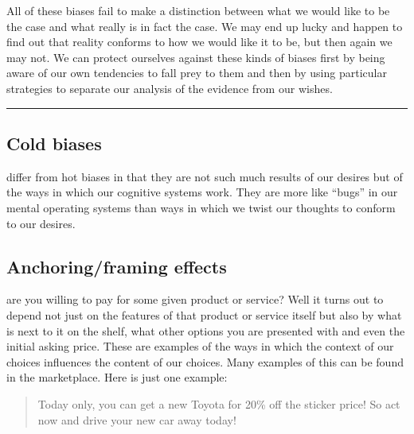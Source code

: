 \documentclass[justified]{tufte-book}
\newenvironment{argument}{\begin{quote}\normalsize}{\end{quote}}
\begin{document}
All of these biases fail to make a distinction between what we would like to be the case and what really is in fact the case. We may end up lucky and happen to find out that reality conforms to how we would like it to be, but then again we may not. We can protect ourselves against these kinds of biases first by being aware of our own tendencies to fall prey to them and then by using particular strategies to separate our analysis of the evidence from our wishes.

\begin{center}\rule{0.5\linewidth}{\linethickness}\end{center}

\hypertarget{cold-biases}{%
\subsection*{\texorpdfstring{\textbf{Cold biases}}{Cold biases}}\label{cold-biases}}

 differ from hot biases in that they are not such much results of our desires but of the ways in which our cognitive systems work. They are more like ``bugs'' in our mental operating systems than ways in which we twist our thoughts to conform to our desires.

\hypertarget{anchoringframing-effects}{%
\subsection*{Anchoring/framing effects}\label{anchoringframing-effects}}

 are you willing to pay for some given product or service? Well it turns out to depend not just on the features of that product or service itself but also by what is next to it on the shelf, what other options you are presented with and even the initial asking price. These are examples of the ways in which the context of our choices influences the content of our choices. Many examples of this can be found in the marketplace. Here is just one example:

\begin{argument}
Today only, you can get a new Toyota for 20\% off the sticker price! So
act now and drive your new car away today!
\end{argument}
\end{document}
